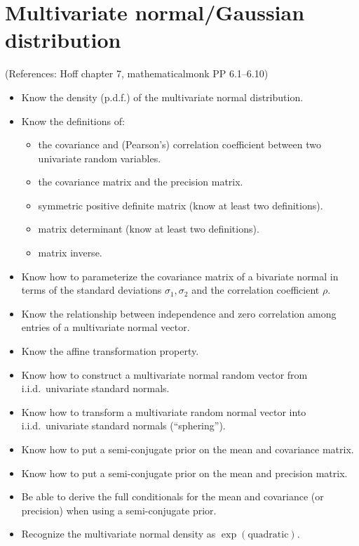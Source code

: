 \documentclass[12pt]{article}
\begin{document}
\section{Multivariate normal/Gaussian distribution}
(References: Hoff chapter 7, mathematicalmonk PP 6.1--6.10)
\begin{itemize}
\setlength\itemsep{0em}
\item Know the density (p.d.f.) of the multivariate normal distribution.
\item Know the definitions of:
\begin{itemize}
\setlength\itemsep{0em}
    \item the covariance and (Pearson's) correlation coefficient between two univariate random variables.
    \item the covariance matrix and the precision matrix.
    \item symmetric positive definite matrix (know at least two definitions).
    \item matrix determinant (know at least two definitions).
    \item matrix inverse.
\end{itemize}
\item Know how to parameterize the covariance matrix of a bivariate normal in terms of the standard deviations $\sigma_1,\sigma_2$ and the correlation coefficient $\rho$.
\item Know the relationship between independence and zero correlation among entries of a multivariate normal vector.
\item Know the affine transformation property.
\item Know how to construct a multivariate normal random vector from i.i.d.\ univariate standard normals.
\item Know how to transform a multivariate random normal vector into i.i.d.\ univariate standard normals (``sphering'').
\item Know how to put a semi-conjugate prior on the mean and covariance matrix.
\item Know how to put a semi-conjugate prior on the mean and precision matrix.
\item Be able to derive the full conditionals for the mean and covariance (or precision) when using a semi-conjugate prior.
\item Recognize the multivariate normal density as $\exp(\text{quadratic})$.
\end{itemize}
\end{document}
